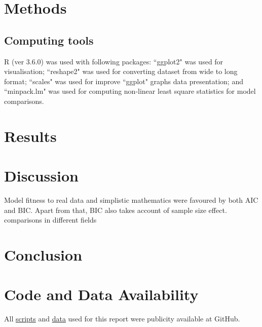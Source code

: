 \documentclass[a4paper, 11pt]{article}
\begin{document}
	\section*{Methods}
	
	
	\subsection*{Computing tools}
	R (ver 3.6.0)\autocite{Rcore} was used with following packages: ``ggplot2"\autocite{ggplot2} was used for visualisation; ``reshape2"\autocite{reshape2} was used for converting dataset from wide to long format; ``scales"\autocite{scales} was used for improve ``ggplot" graphs data presentation; and ``minpack.lm"\autocite{minpacklm} was used for computing non-linear least square statistics for model comparisons.
	
	\section*{Results}
	
	
	\section*{Discussion}
	Model fitness to real data and simplistic mathematics were favoured by both AIC\autocite{johnson2004model,akaike1998information,burnhamdr} and BIC\autocite{johnson2004model,turchin2003complex}.  Apart from that, BIC also takes account of sample size effect\autocite{johnson2004model,turchin2003complex}.\\
	comparisons in different fields\autocite{kuha2004aic,aho2014model,yang2005can,vrieze2012model,wang2006comparison,acquah2010comparison}
	
	\section*{Conclusion}
	
	\section*{Code and Data Availability}
	All \href{https://github.com/ph-u/CMEECourseWork_pmH/tree/master/MiniProject/code}{scripts} and \href{https://github.com/ph-u/CMEECourseWork_pmH/tree/master/MiniProject/data}{data} used for this report were publicity available at GitHub.
	\nocite{*}\printbibliography
\end{document}
